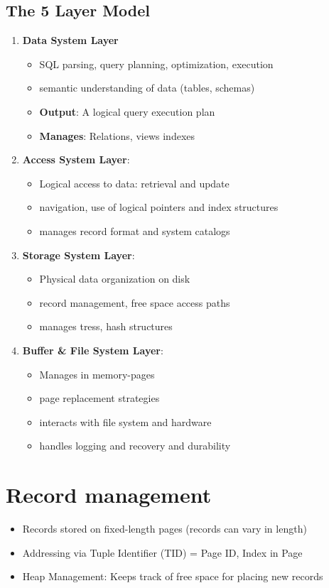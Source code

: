 \subsection{The 5 Layer Model}

\begin{enumerate}
	\item \textbf{Data System Layer}
	\begin{itemize}
		\item SQL parsing, query planning, optimization, execution
		\item semantic understanding of data (tables, schemas)
		\item \textbf{Output}: A logical query execution plan
		\item \textbf{Manages}: Relations, views indexes
	\end{itemize}
	\item \textbf{Access System Layer}: 
	\begin{itemize}
		\item Logical access to data: retrieval and update
		\item navigation, use of logical pointers and index structures
		\item manages record format and system catalogs
	\end{itemize}
	\item \textbf{Storage System Layer}: 
	\begin{itemize}
		\item Physical data organization on disk
		\item record management, free space access paths
		\item manages tress, hash structures
	\end{itemize}
	\item \textbf{Buffer \& File System Layer}: 
	\begin{itemize}
		\item Manages in memory-pages
		\item page replacement strategies
		\item interacts with file system and hardware
		\item handles logging and recovery and durability
	\end{itemize}
\end{enumerate}

\section{Record management}
\begin{itemize}
	\item Records stored on fixed-length pages (records can vary in length)
	\item Addressing via Tuple Identifier (TID) = Page ID, Index in Page
	\item Heap Management: Keeps track of free space for placing new records
\end{itemize}

